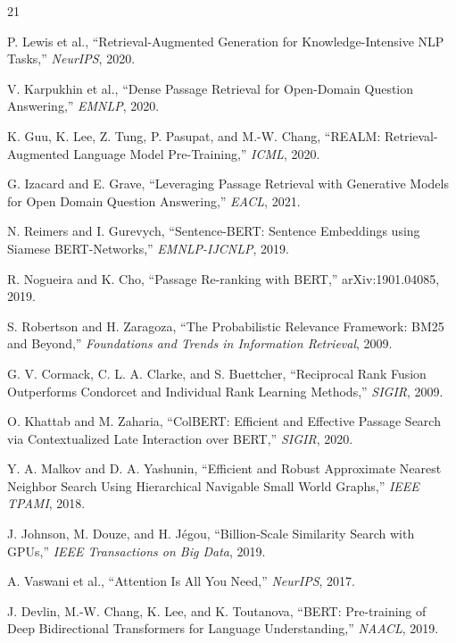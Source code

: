 \documentclass[10pt,a4paper]{article}
\begin{document}
\clearpage
\begin{thebibliography}{21}

P. Lewis et al., ``Retrieval-Augmented Generation for Knowledge-Intensive NLP Tasks,'' \emph{NeurIPS}, 2020.

V. Karpukhin et al., ``Dense Passage Retrieval for Open-Domain Question Answering,'' \emph{EMNLP}, 2020.

K. Guu, K. Lee, Z. Tung, P. Pasupat, and M.-W. Chang, ``REALM: Retrieval-Augmented Language Model Pre-Training,'' \emph{ICML}, 2020.

G. Izacard and E. Grave, ``Leveraging Passage Retrieval with Generative Models for Open Domain Question Answering,'' \emph{EACL}, 2021.

N. Reimers and I. Gurevych, ``Sentence-BERT: Sentence Embeddings using Siamese BERT-Networks,'' \emph{EMNLP-IJCNLP}, 2019.

R. Nogueira and K. Cho, ``Passage Re-ranking with BERT,'' arXiv:1901.04085, 2019.

S. Robertson and H. Zaragoza, ``The Probabilistic Relevance Framework: BM25 and Beyond,'' \emph{Foundations and Trends in Information Retrieval}, 2009.

G. V. Cormack, C. L. A. Clarke, and S. Buettcher, ``Reciprocal Rank Fusion Outperforms Condorcet and Individual Rank Learning Methods,'' \emph{SIGIR}, 2009.

O. Khattab and M. Zaharia, ``ColBERT: Efficient and Effective Passage Search via Contextualized Late Interaction over BERT,'' \emph{SIGIR}, 2020.

Y. A. Malkov and D. A. Yashunin, ``Efficient and Robust Approximate Nearest Neighbor Search Using Hierarchical Navigable Small World Graphs,'' \emph{IEEE TPAMI}, 2018.

J. Johnson, M. Douze, and H. Jégou, ``Billion-Scale Similarity Search with GPUs,'' \emph{IEEE Transactions on Big Data}, 2019.

A. Vaswani et al., ``Attention Is All You Need,'' \emph{NeurIPS}, 2017.

J. Devlin, M.-W. Chang, K. Lee, and K. Toutanova, ``BERT: Pre-training of Deep Bidirectional Transformers for Language Understanding,'' \emph{NAACL}, 2019.


\end{thebibliography}
\end{document}
